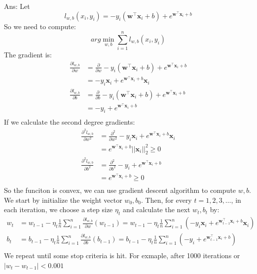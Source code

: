 \documentclass[10pt,letter,notitlepage]{article}
\newcommand{\wv}{\mathbf{w}}
\newcommand{\xv}{\mathbf{x}}
\newcommand{\ans}[1]{{\color{orange}\textsf{Ans}: #1}}
\newcounter{exercise}
\begin{document}
\begin{exercise}
\begin{enumerate}
\ans{
  Let 
  $$
  l_{w,b}(x_i, y_i) = - y_i (\wv^\top \xv_i + b) + e^{\wv^\top \xv_i + b}
  $$
  So we need to compute: 
  $$
  arg\underset{w, b}{\min} \sum_{i=1}^n l_{w,b}(x_i, y_i)
  $$
  The gradient is:
  \begin{align*}
  \frac{\partial l_{w,b}}{\partial w} &= \frac{\partial}{\partial w} - y_i (\wv^\top \xv_i + b) + e^{\wv^\top \xv_i + b} \\
  &= - y_i \xv_i + e^{\wv^\top \xv_i + b} \xv_i \\
  \frac{\partial l_{w,b}}{\partial b} &= \frac{\partial}{\partial b} - y_i (\wv^\top \xv_i + b) + e^{\wv^\top \xv_i + b} \\
  &= - y_i + e^{\wv^\top \xv_i + b} \\
  \end{align*}
  \color{orange}
  If we calculate the second degree gradients:
  \begin{align*}
  \frac{\partial^2 l_{w,b}}{\partial w^2} &= \frac{\partial^2}{\partial w^2} - y_i \xv_i + e^{\wv^\top \xv_i + b} \xv_i \\
  &= e^{\wv^\top \xv_i + b} ||\xv_i||_2^2 \ge 0\\
  \frac{\partial^2 l_{w,b}}{\partial b^2} &= \frac{\partial^2}{\partial b^2} - y_i + e^{\wv^\top \xv_i + b} \\
  &= e^{\wv^\top \xv_i + b} \ge 0\\
  \end{align*}
  So the funciton is convex, we can use gradient descent algorithm to compute $w, b$. We start by initialize the weight vector $w_0, b_0$.
  Then, for every $t=1,2,3,\ldots$, in each iteration, we choose a step size $\eta_t$ and calculate the next $w_t, b_t$ by:
  \begin{align*}
  w_t &= w_{t-1} - \eta_t \frac{1}{n} \sum_{i=1}^{n} \frac{\partial l_{w,b}}{\partial w}(w_{t-1}) = w_{t-1} - \eta_t \frac{1}{n} \sum_{i=1}^{n} (- y_i \xv_i + e^{\wv_{t-1}^\top \xv_i + b} \xv_i) \\
  b_t &= b_{t-1} - \eta_t \frac{1}{n} \sum_{i=1}^{n} \frac{\partial l_{w,b}}{\partial b}(b_{t-1}) = b_{t-1} - \eta_t \frac{1}{n} \sum_{i=1}^{n} (- y_i + e^{\wv_{t-1}^\top \xv_i + b}) \\
  \end{align*}
  We repeat until some stop criteria is hit. For exmaple, after 1000 iterations or $|w_t - w_{t-1}| < 0.001$  
} 

\end{enumerate}
\end{exercise}
\end{document}

